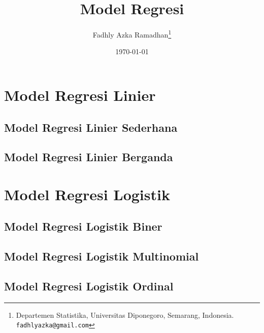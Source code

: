 \documentclass[10pt, letterpaper, openany]{book}
\title{Model Regresi}
\author{Fadhly Azka Ramadhan\thanks{Departemen Statistika, Universitas Diponegoro, Semarang, Indonesia. \texttt{fadhlyazka@gmail.com}}}
\date{\today}
\begin{document}
\frontmatter
\maketitle

\tableofcontents

\mainmatter
\chapter{Model Regresi Linier}
\label{sec:model-regresi-linier}
\section{Model Regresi Linier Sederhana}
\label{sec:mrln-sederhana}

\section{Model Regresi Linier Berganda}
\label{sec:mrln-berganda}


\chapter{Model Regresi Logistik}
\label{sec:model-regresi-logistik}
\section{Model Regresi Logistik Biner}
\label{sec:mrlg-biner}

\section{Model Regresi Logistik Multinomial}
\label{sec:mrlg-multinomial}

\section{Model Regresi Logistik Ordinal}
\label{sec:mrlg-ordinal}


%

\backmatter
\end{document}
